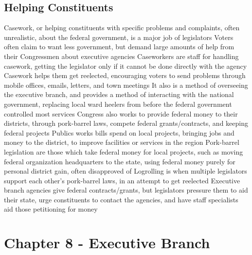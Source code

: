 \documentclass[11 pt, twoside]{article}
\newenvironment{outline*}
{
	\begin{outline}[enumerate]
	}
	{\end{outline}
}
\begin{document}
\subsection{Helping Constituents}
\begin{outline*}
\1 Casework, or helping constituents with specific problems and complaints, often unrealistic, about the federal government, is a major job of legislators
\2 Voters often claim to want less government, but demand large amounts of help from their Congressmen about executive agencies
\2 Caseworkers are staff for handling casework, getting the legislator only if it cannot be done directly with the agency
\2 Casework helps them get reelected, encouraging voters to send problems through mobile offices, emails, letters, and town meetings
\2 It also is a method of overseeing the executive branch, and provides a method of interacting with the national government, replacing local ward heelers from before the federal government controlled most services
\1 Congress also works to provide federal money to their districts, through pork-barrel laws, compete federal grants/contracts, and keeping federal projects
\2 Publics works bills spend on local projects, bringing jobs and money to the district, to improve facilities or services in the region
\2 Pork-barrel legislation are those which take federal money for local projects, such as moving federal organization headquarters to the state, using federal money purely for personal district gain, often disapproved of
\2 Logrolling is when multiple legislators support each other's pork-barrel laws, in an attempt to get reelected
\2 Executive branch agencies give federal contracts/grants, but legislators pressure them to aid their state, urge constituents to contact the agencies, and have staff specialists aid those petitioning for money
\end{outline*}
\section{Chapter 8 - Executive Branch}
\end{document}
